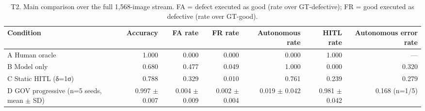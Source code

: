 \begin{table}[t]\centering\small
\caption{T2. Main comparison over the full 1,568-image stream. FA = defect executed as good (rate over GT-defective); FR = good executed as defective (rate over GT-good).}
\label{tab:T2_main_comparison}
\begin{tabular}{lrrrrrr}\hline
Condition & Accuracy & FA rate & FR rate & Autonomous rate & HITL rate & Autonomous error rate \\ \hline
A Human oracle & 1.000 & 0.000 & 0.000 & 0.000 & 1.000 & — \\
B Model only & 0.680 & 0.477 & 0.049 & 1.000 & 0.000 & 0.320 \\
C Static HITL (δ=1σ) & 0.788 & 0.329 & 0.010 & 0.761 & 0.239 & 0.279 \\
D GOV progressive (n=5 seeds, mean $\pm$ SD) & 0.997 $\pm$ 0.007 & 0.004 $\pm$ 0.009 & 0.002 $\pm$ 0.004 & 0.019 $\pm$ 0.042 & 0.981 $\pm$ 0.042 & 0.168 (n=1/5) \\
\hline\end{tabular}
\end{table}

